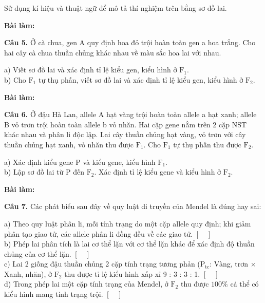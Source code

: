 \documentclass{article}
\begin{document}
Sử dụng kí hiệu và thuật ngữ để mô tả thí nghiệm trên bằng sơ đồ lai.
\vspace{14pt}

\textbf{Bài làm:}
\vspace*{\fill}
\newpage

\fontsize{26}{34}\selectfont
\textbf{Câu 5.} Ở cà chua, gen A quy định hoa đỏ trội hoàn toàn gen a hoa trắng. Cho hai cây cà chua thuần chủng khác nhau về màu sắc hoa lai với nhau.
\vspace{8pt}

a) Viết sơ đồ lai và xác định tỉ lệ kiểu gen, kiểu hình ở $\text{F}_1$.\\[6pt]
b) Cho $\text{F}_1$ tự thụ phấn, viết sơ đồ lai và xác định tỉ lệ kiểu gen, kiểu hình ở $\text{F}_2$.
\vspace{14pt}

\textbf{Bài làm:}
\vspace*{\fill}
\newpage

\fontsize{24}{32}\selectfont
\textbf{Câu 6.} Ở đậu Hà Lan, allele A hạt vàng trội hoàn toàn allele a hạt xanh; allele B vỏ trơn trội hoàn toàn allele b vỏ nhăn. Hai cặp gene nằm trên 2 cặp NST khác nhau và phân li độc lập.
Lai cây thuần chủng hạt vàng, vỏ trơn với cây thuần chủng hạt xanh, vỏ nhăn thu được $\text{F}_1$. Cho $\text{F}_1$ tự thụ phấn thu được $\text{F}_2$.
\vspace{8pt}

a) Xác định kiểu gene P và kiểu gene, kiểu hình $\text{F}_1$.\\[4pt]
b) Lập sơ đồ lai từ P đến $\text{F}_2$. Xác định tỉ lệ kiểu gene và kiểu hình ở $\text{F}_2$.
\vspace{12pt}

\textbf{Bài làm:}
\vspace*{\fill}
\newpage

\fontsize{25}{33}\selectfont
\textbf{Câu 7.} Các phát biểu sau đây về quy luật di truyền của Mendel là đúng hay sai:
\vspace{10pt}

a) Theo quy luật phân li, mỗi tính trạng do một cặp allele quy định; khi giảm phân tạo giao tử, các allele phân li đồng đều về các giao tử. \hfill $[\quad]$\\[8pt]
b) Phép lai phân tích là lai cơ thể lặn với cơ thể lặn khác để xác định độ thuần chủng của cơ thể lặn. \hfill $[\quad]$\\[8pt]
c) Lai 2 giống đậu thuần chủng 2 cặp tính trạng tương phản ($\text{P}_{\text{tc}}$: Vàng, trơn $\times$ Xanh, nhăn), ở $\text{F}_2$ thu được tỉ lệ kiểu hình xấp xỉ 9 : 3 : 3 : 1. \hfill $[\quad]$\\[8pt]
d) Trong phép lai một cặp tính trạng của Mendel, ở $\text{F}_2$ thu được $100\%$ cá thể có kiểu hình mang tính trạng trội. \hfill $[\quad]$
\end{document}
